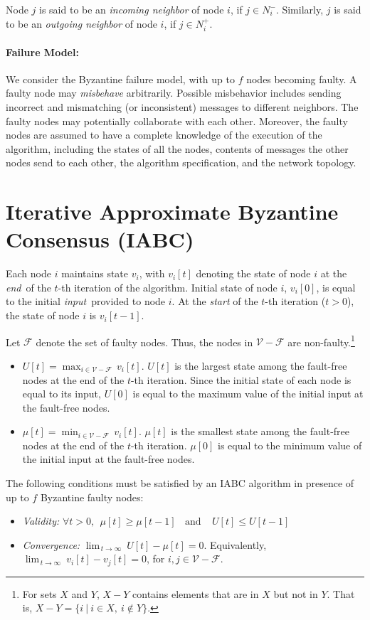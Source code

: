 \documentclass[letterpaper, 12pt]{article}
\newcommand{\scriptf}{\mathcal{F}}
\newcommand{\scriptv}{\mathcal{V}}
\begin{document}
Node $j$ is said to be an {\em incoming neighbor} of node $i$,
if $j\in N_i^-$. Similarly, $j$ is said to be an {\em outgoing neighbor}
of node $i$, if $j\in N_i^+$.


\paragraph{Failure Model:}
We consider the Byzantine failure model, with up to $f$ nodes becoming faulty. A faulty node may {\em misbehave} arbitrarily. Possible misbehavior includes sending incorrect and mismatching (or inconsistent) messages to different neighbors. The faulty nodes may potentially collaborate with each other. Moreover, the faulty nodes are assumed to have a complete knowledge of the execution of
the algorithm, including the states of all the nodes,
contents of messages the other nodes send to each other,
the algorithm specification, and the network topology.

\section{Iterative Approximate Byzantine Consensus (IABC)}
\label{sec:iabc}

Each node $i$ maintains state $v_i$, with $v_i[t]$ denoting the state
of node $i$ at the {\em end}\, of the $t$-th iteration of the algorithm.
Initial state of node $i$,
$v_i[0]$, is equal to the initial {\em input}\, provided to node $i$.
At the {\em start} of the $t$-th iteration ($t>0$), the state of
node $i$ is $v_i[t-1]$.

Let $\scriptf$ denote the set of faulty nodes.
Thus, the nodes
in $\scriptv-\scriptf$ are non-faulty.\footnote{\normalsize For sets $X$ and $Y$, $X-Y$ contains elements that are in $X$ but not in $Y$. That is, $X-Y=\{i~|~ i\in X,~i\not\in Y\}$.} 
\begin{itemize}


\item $U[t] = \max_{i\in\scriptv-\scriptf}\,v_i[t]$. $U[t]$ is the largest state among the fault-free nodes at the end of the $t$-th iteration.
Since the initial state of each node is equal to its input,
$U[0]$ is equal to the maximum value of the initial input at the fault-free nodes.

\item $\mu[t] = \min_{i\in\scriptv-\scriptf}\,v_i[t]$. $\mu[t]$ is the smallest state among the fault-free nodes at the end of the $t$-th iteration.
$\mu[0]$ is equal to the minimum value of the initial input at the
fault-free nodes.
\end{itemize}
The following conditions must be satisfied by an IABC algorithm
in presence of up to $f$ Byzantine faulty nodes:
\begin{itemize}
\item {\em Validity:} $\forall t>0,
~~\mu[t]\ge \mu[t-1]
~\mbox{~~and~~}~
~U[t]\le U[t-1]$

\item {\em Convergence:} $\lim_{\,t\rightarrow\infty} ~ U[t]-\mu[t] = 0$.
Equivalently, $\lim_{\,t\rightarrow\infty} ~ v_i[t]-v_j[t] = 0$, for
$i,j\in \scriptv-\scriptf$.
\end{itemize}
\end{document}
